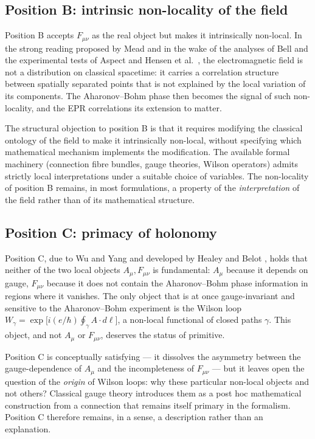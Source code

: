 \subsection{Position B: intrinsic non-locality of the field}
\label{ssec:position_B_en}

Position B accepts $F_{\mu\nu}$ as the real object but makes it
intrinsically non-local. In the strong reading proposed by Mead
\cite{Mead2000} and in the wake of the analyses of Bell
\cite{Bell1964} and the experimental tests of Aspect
\cite{Aspect1982} and Hensen et al.~\cite{Hensen2015},
the electromagnetic field is not a distribution on classical
spacetime: it carries a correlation structure between spatially
separated points that is not explained by the local variation of
its components. The Aharonov--Bohm phase then becomes the signal
of such non-locality, and the EPR correlations its extension to
matter.

The structural objection to position B is that it requires
modifying the classical ontology of the field to make it
intrinsically non-local, without specifying which mathematical
mechanism implements the modification. The available formal
machinery (connection fibre bundles, gauge theories, Wilson
operators) admits strictly local interpretations under a suitable
choice of variables. The non-locality of position B remains, in
most formulations, a property of the \emph{interpretation} of the
field rather than of its mathematical structure.

\subsection{Position C: primacy of holonomy}
\label{ssec:position_C_en}

Position C, due to Wu and Yang \cite{WuYang1975} and developed by
Healey \cite{Healey2007} and Belot \cite{Belot1998}, holds that
neither of the two local objects $A_\mu, F_{\mu\nu}$ is
fundamental: $A_\mu$ because it depends on gauge, $F_{\mu\nu}$
because it does not contain the Aharonov--Bohm phase information
in regions where it vanishes. The only object that is at once
gauge-invariant and sensitive to the Aharonov--Bohm experiment is
the Wilson loop $W_\gamma = \exp\bigl[i (e/\hbar) \oint_\gamma A
\cdot d\ell\bigr]$, a non-local functional of closed paths $\gamma$.
This object, and not $A_\mu$ or $F_{\mu\nu}$, deserves the status
of primitive.

Position C is conceptually satisfying --- it dissolves the
asymmetry between the gauge-dependence of $A_\mu$ and the
incompleteness of $F_{\mu\nu}$ --- but it leaves open the question
of the \emph{origin} of Wilson loops: why these particular
non-local objects and not others? Classical gauge theory introduces
them as a post hoc mathematical construction from a connection
that remains itself primary in the formalism. Position C therefore
remains, in a sense, a description rather than an explanation.

